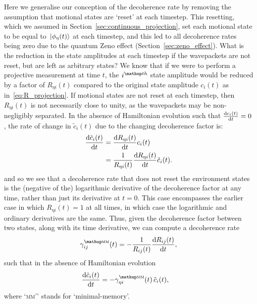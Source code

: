 Here we generalise our conception of the decoherence rate by removing the assumption that motional states are `reset' at each timestep. This resetting, which we assumed in Section~\ref{sec:continuous_projection}, set each motional state to be equal to $\ket{\phi_\eta(t)}$ at each timestep, and this led to all decoherence rates being zero due to the quantum Zeno effect (Section~\ref{sec:zeno_effect}). What is the reduction in the state amplitudes at each timestep if the wavepackets are not reset, but are left as arbitrary states? We know that if we were to perform a projective measurement at time $t$, the $i^\up{th}$ state amplitude would be reduced by a factor of $R_{\eta i}(t)$ compared to the original state amplitude $c_i(t)$ as in~\eqref{eq:R_projection}. If motional states are not reset at each timestep, then $R_{\eta i}(t)$ is not necessarily close to unity, as the wavepackets may be non-negligibly separated. In the absence of Hamiltonian evolution such that $\dv{c_i(t)}{t}=0$, the rate of change in $\tilde c_i(t)$ due to the changing decoherence factor is:
\begin{align}
\dv{\tilde c_i(t)}{t} &= \dv{R_{\eta i}(t)}{t} c_i(t)\\
&= \frac1{R_{\eta i}(t)}\dv{R_{\eta i}(t)}{t} \tilde c_i(t).
\end{align}
and so we see that a decoherence rate that does not reset the environment states is the (negative of the) logarithmic derivative of the decoherence factor at any time, rather than just its derivative at $t=0$. This case encompasses the earlier case in which $R_{\eta i}(t) = 1$ at all times, in which case the logarithmic and ordinary derivatives are the same. Thus, given the decoherence factor between two states, along with its time derivative, we can compute a decoherence rate
\begin{align}
\gamma^\up{\textsc{mm}}_{ij}(t) =  -\frac1{R_{ij}(t)}\dv{R_{ij}(t)}{t},
\end{align}
such that in the absence of Hamiltonian evolution
\begin{align}
\dv{\tilde c_i(t)}{t} &= -\gamma^\up{\textsc{mm}}_{\eta i}(t)\,\tilde c_i(t),
\end{align}
where `\textsc{mm}'' stands for `minimal-memory'.

